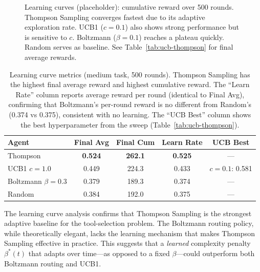 \documentclass[12pt]{article}
\theoremstyle{definition}
\begin{document}
\begin{figure}[htb]
  \centering
  \caption{Learning curves (placeholder): cumulative reward over 500 rounds. Thompson Sampling converges fastest due to its adaptive exploration rate. UCB1 ($c=0.1$) also shows strong performance but is sensitive to $c$. Boltzmann ($\beta=0.1$) reaches a plateau quickly. Random serves as baseline. See Table~\ref{tab:ucb-thompson} for final average rewards.}
  \label{fig:learning-curves}
\end{figure}

\begin{table}[htb]
  \centering
  \begin{tabular}{lcccc}
    \toprule
    Agent & Final Avg & Final Cum & Learn Rate & UCB Best \\
    \midrule
    Thompson & \textbf{0.524} & \textbf{262.1} & \textbf{0.525} & --- \\
    UCB1 $c=1.0$ & 0.449 & 224.3 & 0.433 & $c=0.1$: 0.581 \\
    Boltzmann $\beta=0.3$ & 0.379 & 189.3 & 0.374 & --- \\
    Random & 0.384 & 192.0 & 0.375 & --- \\
    \bottomrule
  \end{tabular}
  \caption{Learning curve metrics (medium task, 500 rounds). Thompson Sampling has the highest final average reward and highest cumulative reward. The ``Learn Rate'' column reports average reward per round (identical to Final Avg), confirming that Boltzmann's per-round reward is no different from Random's (0.374 vs 0.375), consistent with no learning. The ``UCB Best'' column shows the best hyperparameter from the sweep (Table~\ref{tab:ucb-thompson}).}
  \label{tab:learning-curves}
\end{table}

The learning curve analysis confirms that Thompson Sampling is the strongest adaptive baseline for the tool-selection problem. The Boltzmann routing policy, while theoretically elegant, lacks the learning mechanism that makes Thompson Sampling effective in practice. This suggests that a \emph{learned} complexity penalty $\beta^*(t)$ that adapts over time---as opposed to a fixed $\beta$---could outperform both Boltzmann routing and UCB1.
\end{document}
